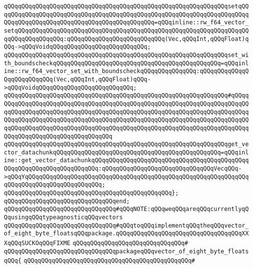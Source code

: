 \verb|qQQqqQQqqQQqqQQqqQQqqQQqqQQqqQQqqQQqqQQqqQQqqQQqqQQqqQQqqQQqqQQqsetqQQqqQQqqQQqqQQqqQQqqQQqqQQqqQQqqQQqqQQqqQQqqQQqqQQqqQQqqQQqqQQqqQQqqQQqqQQqqQQqqQQqqQQqqQQqqQQqqQQqqQQqqQQqqQQqqQQq=qQQqinline::rw_f64_vector_setqQQqqQQqqQQqqQQqqQQqqQQqqQQqqQQqqQQqqQQqqQQqqQQqqQQqqQQqqQQqqQQqqQQqqQQqqQQqqQQqqQQq:qQQqqQQqqQQqqQQqqQQqqQQqqQQq(Vec,qQQqInt,qQQqFloat)qQQq->qQQqVoidqQQqqQQqqQQqqQQqqQQqqQQqqQQq;|\newline
\verb|qQQqqQQqqQQqqQQqqQQqqQQqqQQqqQQqqQQqqQQqqQQqqQQqqQQqqQQqqQQqqQQqset_with_boundscheckqQQqqQQqqQQqqQQqqQQqqQQqqQQqqQQqqQQqqQQqqQQqqQQq=qQQqinline::rw_f64_vector_set_with_boundscheckqQQqqQQqqQQqqQQq:qQQqqQQqqQQqqQQqqQQqqQQqqQQq(Vec,qQQqInt,qQQqFloat)qQQq->qQQqVoidqQQqqQQqqQQqqQQqqQQqqQQqqQQq;|\newline
\verb|qQQqqQQqqQQqqQQqqQQqqQQqqQQqqQQqqQQqqQQqqQQqqQQqqQQqqQQqqQQqqQQq#qQQqqQQqqQQqqQQqqQQqqQQqqQQqqQQqqQQqqQQqqQQqqQQqqQQqqQQqqQQqqQQqqQQqqQQqqQQqqQQqqQQqqQQqqQQqqQQqqQQqqQQqqQQqqQQqqQQqqQQqqQQqqQQqqQQqqQQqqQQqqQQqqQQqqQQqqQQqqQQqqQQqqQQqqQQqqQQqqQQqqQQqqQQqqQQqqQQqqQQqqQQqqQQqqQQqqQQqqQQqqQQqqQQqqQQqqQQqqQQqqQQqqQQqqQQqqQQqqQQqqQQqqQQqqQQqqQQqqQQqqQQqqQQqqQQqqQQqqQQqqQQqqQQqqQQqqQQq|\newline
\verb|qQQqqQQqqQQqqQQqqQQqqQQqqQQqqQQqqQQqqQQqqQQqqQQqqQQqqQQqqQQqqQQqget_vector_datachunkqQQqqQQqqQQqqQQqqQQqqQQqqQQqqQQqqQQqqQQqqQQqqQQq=qQQqinline::get_vector_datachunkqQQqqQQqqQQqqQQqqQQqqQQqqQQqqQQqqQQqqQQqqQQqqQQqqQQqqQQqqQQqqQQqqQQqqQQq:qQQqqQQqqQQqqQQqqQQqqQQqqQQqqQQqVecqQQq->qQQqYqQQqqQQqqQQqqQQqqQQqqQQqqQQqqQQqqQQqqQQqqQQqqQQqqQQqqQQqqQQqqQQqqQQqqQQqqQQqqQQqqQQqqQQqqQQq;|\newline
\verb|qQQqqQQqqQQqqQQqqQQqqQQqqQQqqQQqqQQqqQQqqQQqqQQq};|\newline
\verb|qQQqqQQqqQQqqQQqqQQqqQQqqQQqqQQqend;|\newline
\newline
\verb|qQQqqQQqqQQqqQQqqQQqqQQqqQQqqQQq#qQQqNOTE:qQQqweqQQqareqQQqcurrentlyqQQqusingqQQqtypeagnosticqQQqvectors|\newline
\verb|qQQqqQQqqQQqqQQqqQQqqQQqqQQqqQQq#qQQqtoqQQqimplementqQQqtheqQQqvector_of_eight_byte_floatsqQQqpackage.qQQqqQQqqQQqqQQqqQQqqQQqqQQqqQQqqQQqXXXqQQqSUCKOqQQqFIXME|\newline
\verb|qQQqqQQqqQQqqQQqqQQqqQQqqQQqqQQq#|\newline
\verb|qQQqqQQqqQQqqQQqqQQqqQQqqQQqqQQqpackageqQQqvector_of_eight_byte_floatsqQQq{|\newline
\verb|qQQqqQQqqQQqqQQqqQQqqQQqqQQqqQQqqQQqqQQqqQQqqQQq#|\newline
